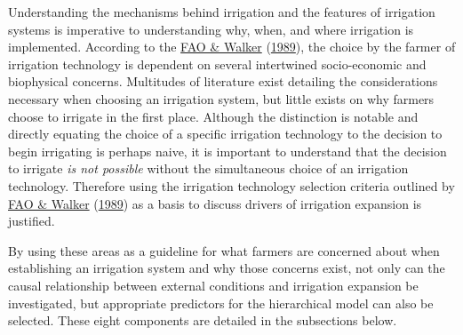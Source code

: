 \documentclass[12pt,twoside]{reedthesis}
\begin{document}
Understanding the mechanisms behind irrigation and the features of irrigation systems is imperative to understanding why, when, and where irrigation is implemented. According to the \protect\hyperlink{ref-faoGuidelinesDesigningEvaluating1989}{FAO \& Walker} (\protect\hyperlink{ref-faoGuidelinesDesigningEvaluating1989}{1989}), the choice by the farmer of irrigation technology is dependent on several intertwined socio-economic and biophysical concerns. Multitudes of literature exist detailing the considerations necessary when choosing an irrigation system, but little exists on why farmers choose to irrigate in the first place. Although the distinction is notable and directly equating the choice of a specific irrigation technology to the decision to begin irrigating is perhaps naive, it is important to understand that the decision to irrigate \emph{is not possible} without the simultaneous choice of an irrigation technology. Therefore using the irrigation technology selection criteria outlined by \protect\hyperlink{ref-faoGuidelinesDesigningEvaluating1989}{FAO \& Walker} (\protect\hyperlink{ref-faoGuidelinesDesigningEvaluating1989}{1989}) as a basis to discuss drivers of irrigation expansion is justified.

By using these areas as a guideline for what farmers are concerned about when establishing an irrigation system and why those concerns exist, not only can the causal relationship between external conditions and irrigation expansion be investigated, but appropriate predictors for the hierarchical model can also be selected. These eight components are detailed in the subsections below.
\end{document}
